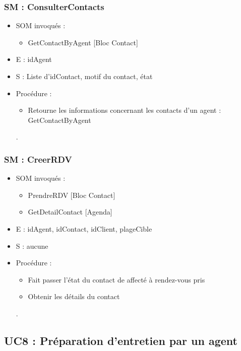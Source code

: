 \subsubsection{SM : ConsulterContacts}
\begin{itemize}
	\item SOM invoqués : 
	\begin{itemize}
		\item GetContactByAgent [Bloc Contact]
	\end{itemize}
	\item E : idAgent
	\item S : Liste d’idContact, motif du contact, état
	\item Procédure : 
	\begin{itemize}
		\item Retourne les informations concernant les contacts d'un agent : GetContactByAgent
	\end{itemize}.
\end{itemize}

\subsubsection{SM : CreerRDV}
\begin{itemize}
	\item SOM invoqués : 
	\begin{itemize}
		\item PrendreRDV [Bloc Contact]
		\item GetDetailContact [Agenda]
	\end{itemize}
	\item E : idAgent, idContact, idClient, plageCible
	\item S : aucune
	\item Procédure : 
	\begin{itemize}
		\item Fait passer l’état du contact de affecté à rendez-vous pris
		\item Obtenir les détails du contact
	\end{itemize}.
\end{itemize}



\subsection{UC8 : Préparation d’entretien par un agent}
